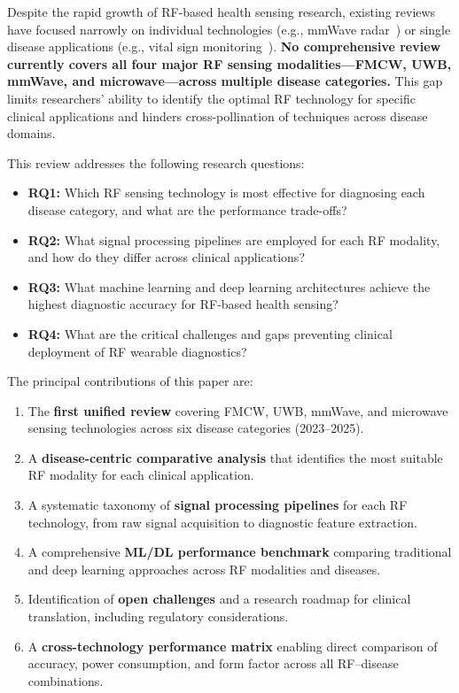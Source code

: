 \documentclass[journal,twoside]{IEEEtran}
\begin{document}
Despite the rapid growth of RF-based health sensing research, existing reviews have focused narrowly on individual technologies (e.g., mmWave radar~\cite{ref_mmwave_review2023}) or single disease applications (e.g., vital sign monitoring~\cite{ref_mmwave_vital2025}). \textbf{No comprehensive review currently covers all four major RF sensing modalities---FMCW, UWB, mmWave, and microwave---across multiple disease categories.} This gap limits researchers' ability to identify the optimal RF technology for specific clinical applications and hinders cross-pollination of techniques across disease domains.

This review addresses the following research questions:
\begin{itemize}
    \item \textbf{RQ1:} Which RF sensing technology is most effective for diagnosing each disease category, and what are the performance trade-offs?
    \item \textbf{RQ2:} What signal processing pipelines are employed for each RF modality, and how do they differ across clinical applications?
    \item \textbf{RQ3:} What machine learning and deep learning architectures achieve the highest diagnostic accuracy for RF-based health sensing?
    \item \textbf{RQ4:} What are the critical challenges and gaps preventing clinical deployment of RF wearable diagnostics?
\end{itemize}

The principal contributions of this paper are:
\begin{enumerate}
    \item The \textbf{first unified review} covering FMCW, UWB, mmWave, and microwave sensing technologies across six disease categories (2023--2025).
    \item A \textbf{disease-centric comparative analysis} that identifies the most suitable RF modality for each clinical application.
    \item A systematic taxonomy of \textbf{signal processing pipelines} for each RF technology, from raw signal acquisition to diagnostic feature extraction.
    \item A comprehensive \textbf{ML/DL performance benchmark} comparing traditional and deep learning approaches across RF modalities and diseases.
    \item Identification of \textbf{open challenges} and a research roadmap for clinical translation, including regulatory considerations.
    \item A \textbf{cross-technology performance matrix} enabling direct comparison of accuracy, power consumption, and form factor across all RF--disease combinations.
\end{enumerate}
\end{document}
